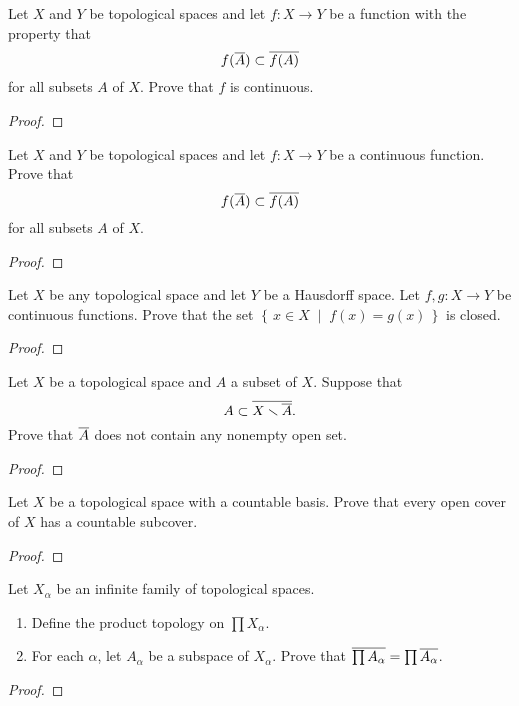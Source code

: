 \begin{problem}
Let $X$ and $Y$ be topological spaces and let $f\colon X\to Y$ be
a function with the property that
\[
f(\overline{A})\subset\overline{f(A)}
\]
for all subsets $A$ of $X$. Prove that $f$ is continuous.
\end{problem}
\begin{proof}
\end{proof}
\begin{problem}
Let $X$ and $Y$ be topological spaces and let $f\colon X\to Y$ be
a continuous function. Prove that
\[
f(\overline{A})\subset\overline{f(A)}
\]
for all subsets $A$ of $X$.
\end{problem}
\begin{proof}
\end{proof}
\begin{problem}
Let $X$ be any topological space and let $Y$ be a Hausdorff
space. Let $f,g\colon X\to Y$ be continuous functions. Prove that
the set $\left\{\,x\in X\;\middle|\;f(x)=g(x)\,\right\}$ is
closed.
\end{problem}
\begin{proof}
\end{proof}
\begin{problem}
Let $X$ be a topological space and $A$ a subset of $X$. Suppose that
\[
A\subset\overline{X\smallsetminus\overline{A}}.
\]
Prove that $\overline{A}$ does not contain any nonempty open set.
\end{problem}
\begin{proof}
\end{proof}
\begin{problem}
Let $X$ be a topological space with a countable basis. Prove that
every open cover of $X$ has a countable subcover.
\end{problem}
\begin{proof}
\end{proof}
\begin{problem}
Let $X_\alpha$ be an infinite family of topological spaces.
\begin{enumerate}[noitemsep,label=(\alph*)]
\item Define the product topology on $\prod X_\alpha$.
\item For each $\alpha$, let $A_\alpha$ be a subspace of
  $X_\alpha$. Prove that $\overline{\prod
    A_\alpha}=\prod\overline{A_\alpha}$.
\end{enumerate}
\end{problem}
\begin{proof}
\end{proof}
